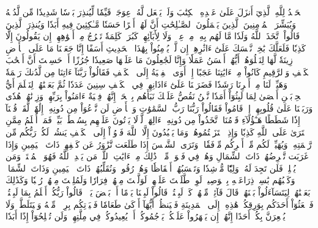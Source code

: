 ٱلۡحَمۡدُ لِلَّهِ ٱلَّذِيٓ أَنزَلَ عَلَىٰ عَبۡدِهِ ٱلۡكِتَٰبَ وَلَمۡ يَجۡعَل لَّهُۥ عِوَجَاۜ
قَيِّمٗا لِّيُنذِرَ بَأۡسٗا شَدِيدٗا مِّن لَّدُنۡهُ وَيُبَشِّرَ ٱلۡمُؤۡمِنِينَ ٱلَّذِينَ يَعۡمَلُونَ ٱلصَّـٰلِحَٰتِ أَنَّ لَهُمۡ أَجۡرًا حَسَنٗا
مَّـٰكِثِينَ فِيهِ أَبَدٗا
وَيُنذِرَ ٱلَّذِينَ قَالُواْ ٱتَّخَذَ ٱللَّهُ وَلَدٗا
مَّا لَهُم بِهِۦ مِنۡ عِلۡمٖ وَلَا لِأٓبَآئِهِمۡۚ كَبُرَتۡ كَلِمَةٗ تَخۡرُجُ مِنۡ أَفۡوَٰهِهِمۡۚ إِن يَقُولُونَ إِلَّا كَذِبٗا
فَلَعَلَّكَ بَٰخِعٞ نَّفۡسَكَ عَلَىٰٓ ءَاثَٰرِهِمۡ إِن لَّمۡ يُؤۡمِنُواْ بِهَٰذَا ٱلۡحَدِيثِ أَسَفًا
إِنَّا جَعَلۡنَا مَا عَلَى ٱلۡأَرۡضِ زِينَةٗ لَّهَا لِنَبۡلُوَهُمۡ أَيُّهُمۡ أَحۡسَنُ عَمَلٗا
وَإِنَّا لَجَٰعِلُونَ مَا عَلَيۡهَا صَعِيدٗا جُرُزًا
أَمۡ حَسِبۡتَ أَنَّ أَصۡحَٰبَ ٱلۡكَهۡفِ وَٱلرَّقِيمِ كَانُواْ مِنۡ ءَايَٰتِنَا عَجَبًا
إِذۡ أَوَى ٱلۡفِتۡيَةُ إِلَى ٱلۡكَهۡفِ فَقَالُواْ رَبَّنَآ ءَاتِنَا مِن لَّدُنكَ رَحۡمَةٗ وَهَيِّئۡ لَنَا مِنۡ أَمۡرِنَا رَشَدٗا
فَضَرَبۡنَا عَلَىٰٓ ءَاذَانِهِمۡ فِي ٱلۡكَهۡفِ سِنِينَ عَدَدٗا
ثُمَّ بَعَثۡنَٰهُمۡ لِنَعۡلَمَ أَيُّ ٱلۡحِزۡبَيۡنِ أَحۡصَىٰ لِمَا لَبِثُوٓاْ أَمَدٗا
نَّحۡنُ نَقُصُّ عَلَيۡكَ نَبَأَهُم بِٱلۡحَقِّۚ إِنَّهُمۡ فِتۡيَةٌ ءَامَنُواْ بِرَبِّهِمۡ وَزِدۡنَٰهُمۡ هُدٗى
وَرَبَطۡنَا عَلَىٰ قُلُوبِهِمۡ إِذۡ قَامُواْ فَقَالُواْ رَبُّنَا رَبُّ ٱلسَّمَٰوَٰتِ وَٱلۡأَرۡضِ لَن نَّدۡعُوَاْ مِن دُونِهِۦٓ إِلَٰهٗاۖ لَّقَدۡ قُلۡنَآ إِذٗا شَطَطًا
هَـٰٓؤُلَآءِ قَوۡمُنَا ٱتَّخَذُواْ مِن دُونِهِۦٓ ءَالِهَةٗۖ لَّوۡلَا يَأۡتُونَ عَلَيۡهِم بِسُلۡطَٰنِۭ بَيِّنٖۖ فَمَنۡ أَظۡلَمُ مِمَّنِ ٱفۡتَرَىٰ عَلَى ٱللَّهِ كَذِبٗا
وَإِذِ ٱعۡتَزَلۡتُمُوهُمۡ وَمَا يَعۡبُدُونَ إِلَّا ٱللَّهَ فَأۡوُۥٓاْ إِلَى ٱلۡكَهۡفِ يَنشُرۡ لَكُمۡ رَبُّكُم مِّن رَّحۡمَتِهِۦ وَيُهَيِّئۡ لَكُم مِّنۡ أَمۡرِكُم مِّرۡفَقٗا
۞وَتَرَى ٱلشَّمۡسَ إِذَا طَلَعَت تَّزَٰوَرُ عَن كَهۡفِهِمۡ ذَاتَ ٱلۡيَمِينِ وَإِذَا غَرَبَت تَّقۡرِضُهُمۡ ذَاتَ ٱلشِّمَالِ وَهُمۡ فِي فَجۡوَةٖ مِّنۡهُۚ ذَٰلِكَ مِنۡ ءَايَٰتِ ٱللَّهِۗ مَن يَهۡدِ ٱللَّهُ فَهُوَ ٱلۡمُهۡتَدِۖ وَمَن يُضۡلِلۡ فَلَن تَجِدَ لَهُۥ وَلِيّٗا مُّرۡشِدٗا
وَتَحۡسَبُهُمۡ أَيۡقَاظٗا وَهُمۡ رُقُودٞۚ وَنُقَلِّبُهُمۡ ذَاتَ ٱلۡيَمِينِ وَذَاتَ ٱلشِّمَالِۖ وَكَلۡبُهُم بَٰسِطٞ ذِرَاعَيۡهِ بِٱلۡوَصِيدِۚ لَوِ ٱطَّلَعۡتَ عَلَيۡهِمۡ لَوَلَّيۡتَ مِنۡهُمۡ فِرَارٗا وَلَمُلِئۡتَ مِنۡهُمۡ رُعۡبٗا
وَكَذَٰلِكَ بَعَثۡنَٰهُمۡ لِيَتَسَآءَلُواْ بَيۡنَهُمۡۚ قَالَ قَآئِلٞ مِّنۡهُمۡ كَمۡ لَبِثۡتُمۡۖ قَالُواْ لَبِثۡنَا يَوۡمًا أَوۡ بَعۡضَ يَوۡمٖۚ قَالُواْ رَبُّكُمۡ أَعۡلَمُ بِمَا لَبِثۡتُمۡ فَٱبۡعَثُوٓاْ أَحَدَكُم بِوَرِقِكُمۡ هَٰذِهِۦٓ إِلَى ٱلۡمَدِينَةِ فَلۡيَنظُرۡ أَيُّهَآ أَزۡكَىٰ طَعَامٗا فَلۡيَأۡتِكُم بِرِزۡقٖ مِّنۡهُ وَلۡيَتَلَطَّفۡ وَلَا يُشۡعِرَنَّ بِكُمۡ أَحَدًا
إِنَّهُمۡ إِن يَظۡهَرُواْ عَلَيۡكُمۡ يَرۡجُمُوكُمۡ أَوۡ يُعِيدُوكُمۡ فِي مِلَّتِهِمۡ وَلَن تُفۡلِحُوٓاْ إِذًا أَبَدٗا
